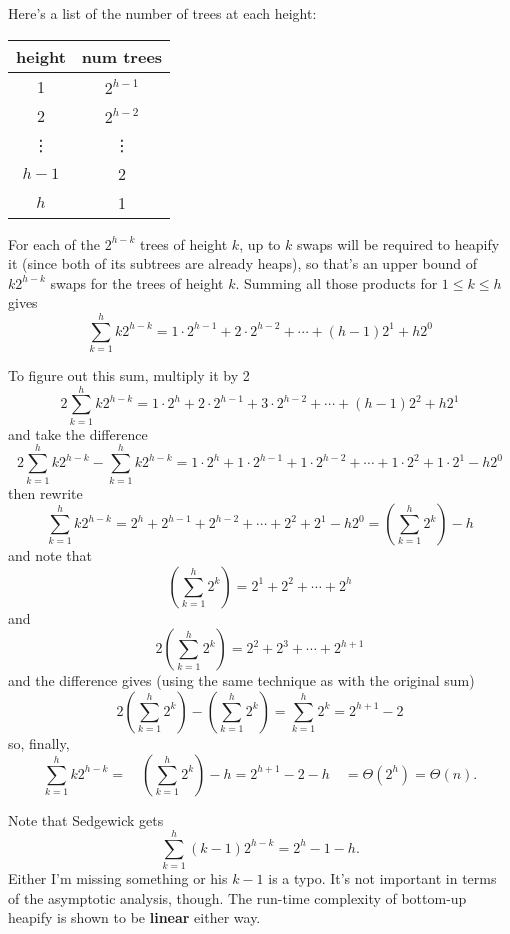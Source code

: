 \documentclass{article}
\begin{document}
\vspace{1pc}
Here's a list of the number of trees at each height:
\begin{center}
\begin{tabular}{c|c}
height  & num trees \\
\hline
 1      & $2^{h-1}$ \\
 2      & $2^{h-2}$ \\
 \vdots & \vdots    \\
 $h-1$  & 2         \\
 $h$    & 1         \\
\end{tabular}
\end{center}

For each of the $2^{h-k}$ trees of height $k$, up to $k$ swaps will be required
to heapify it (since both of its subtrees are already heaps), so that's an
upper bound of $k2^{h-k}$ swaps for the trees of height $k$. Summing all those
products for
$1\le k\le h$ gives
\[
  \sum_{k=1}^{h} k2^{h-k}
=
  1\cdot2^{h-1} + 2\cdot2^{h-2} + \cdots + (h-1)2^1 + h2^0
\]

To figure out this sum, multiply it by 2
\[
  2\sum_{k=1}^{h} k2^{h-k}
=
  1\cdot2^{h} + 2\cdot2^{h-1} + 3\cdot2^{h-2} + \cdots + (h-1)2^2 + h2^1
\]
and take the difference
\[
  2\sum_{k=1}^{h} k2^{h-k}
-
  \sum_{k=1}^{h} k2^{h-k}
=
  1\cdot2^{h} + 1\cdot2^{h-1} + 1\cdot2^{h-2} + \cdots + 1\cdot2^2 + 1\cdot2^1 - h2^0
\]
then rewrite
\[
  \sum_{k=1}^{h} k2^{h-k}
=
  2^{h} + 2^{h-1} + 2^{h-2} + \cdots + 2^2 + 2^1 - h2^0
=
  \left(\sum_{k=1}^{h} 2^{k}\right) - h
\]
and note that
\[
  \left(\sum_{k=1}^{h} 2^{k}\right)
= 
  2^1 + 2^2 + \cdots + 2^h
\]
and
\[
  2\left(\sum_{k=1}^{h} 2^{k}\right)
= 
  2^2 + 2^3 + \cdots + 2^{h+1}
\]
and the difference gives (using the same technique as with the original sum)
\[
  2\left(\sum_{k=1}^{h} 2^{k}\right)
  -\left(\sum_{k=1}^{h} 2^{k}\right)
=
  \sum_{k=1}^{h} 2^{k}
=
  2^{h+1} - 2
\]
so, finally,
\[
  \sum_{k=1}^{h} k2^{h-k}
=
\quad
  \left(\sum_{k=1}^{h} 2^{k}\right) - h
=
  2^{h+1} - 2 - h
\quad
=
  \Theta(2^h)
=
  \Theta(n).
\]

Note that Sedgewick gets
\[
  \sum_{k=1}^{h} (k-1)2^{h-k}
=
  2^{h} - 1 - h.
\]
Either I'm missing something or his $k-1$ is a typo.
It's not important in terms of the asymptotic analysis, though.
The run-time complexity of bottom-up heapify is shown to be \textbf{linear}
either way.
\end{document}
